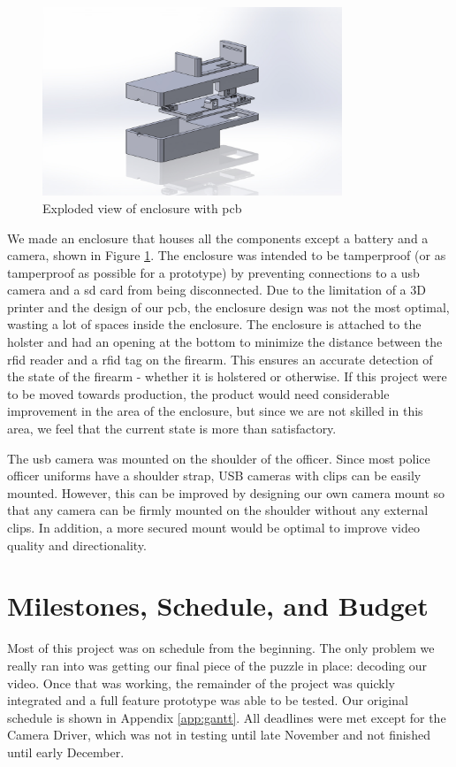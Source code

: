 \documentclass[12pt]{article}
\begin{document}
\begin{figure}[h]
    \centering
    \includegraphics[width=0.8\textwidth]{exploded_enclosure}
    \caption{Exploded view of enclosure with \gls{pcb}}
    \label{fig:exploded_enclosure}
\end{figure}

We made an enclosure that houses all the components except a battery and a
camera, shown in Figure \ref{fig:exploded_enclosure}. The enclosure was
intended to be tamperproof (or as tamperproof as possible for a prototype) by
preventing connections to a \gls{usb} camera and a \gls{sd} card from being
disconnected.  Due to the limitation of a 3D printer and the design of our
\gls{pcb}, the enclosure design was not the most optimal, wasting a lot of spaces
inside the enclosure.  The enclosure is attached to the holster and had an
opening at the bottom to minimize the distance between the \gls{rfid} reader and a
\gls{rfid} tag on the firearm.  This ensures an accurate detection of the state of
the firearm - whether it is holstered or otherwise. If this project were to be
moved towards production, the product would need considerable improvement in
the area of the enclosure, but since we are not skilled in this area, we feel
that the current state is more than satisfactory.

The \gls{usb} camera was mounted on the shoulder of the officer. Since most
police officer uniforms have a shoulder strap, USB cameras with clips can be
easily mounted. However, this can be improved by designing our own camera mount
so that any camera can be firmly mounted on the shoulder without any external
clips. In addition, a more secured mount would be optimal to improve video
quality and directionality.

\section{Milestones, Schedule, and Budget}
Most of this project was on schedule from the beginning. The only problem we
really ran into was getting our final piece of the puzzle in place: decoding
our video. Once that was working, the remainder of the project was quickly
integrated and a full feature prototype was able to be tested. Our original
schedule is shown in Appendix \ref{app:gantt}. All deadlines were met except
for the Camera Driver, which was not in testing until late November and not
finished until early December.
\end{document}
